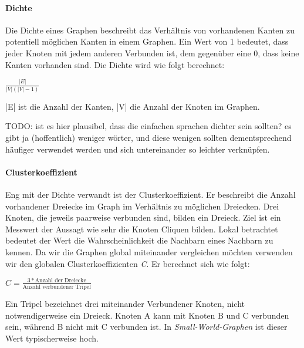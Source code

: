 \documentclass[12pt, a4paper]{article}
\begin{document}
\paragraph{Dichte}
Die Dichte eines Graphen beschreibt das Verhältnis von vorhandenen Kanten zu
potentiell möglichen Kanten in einem Graphen. Ein Wert von 1 bedeutet, dass
jeder Knoten mit jedem anderen Verbunden ist, dem gegenüber eine 0, dass keine
Kanten vorhanden sind. Die Dichte wird wie folgt berechnet:

\begin{center}
  \begin{math}
    \frac{|E|}{|V|(|V|-1)}
  \end{math}
\end{center}


|E| ist die Anzahl der Kanten, |V| die Anzahl der Knoten im Graphen. 

TODO: ist es hier plausibel, dass die einfachen sprachen dichter sein sollten?
es gibt ja (hoffentlich) weniger wörter, und diese wenigen sollten
dementsprechend häufiger verwendet werden und sich untereinander so leichter
verknüpfen.

\paragraph{Clusterkoeffizient}
Eng mit der Dichte verwandt ist der Clusterkoeffizient. Er beschreibt die
Anzahl vorhandener Dreiecke im Graph im Verhältnis zu möglichen Dreiecken. Drei
Knoten, die jeweils paarweise verbunden sind, bilden ein Dreieck. Ziel ist ein
Messwert der Aussagt wie sehr die Knoten Cliquen bilden. Lokal betrachtet
bedeutet der Wert die Wahrscheinlichkeit die Nachbarn eines Nachbarn zu kennen.
Da wir die Graphen global miteinander vergleichen möchten verwenden wir den
globalen Clusterkoeffizienten \emph{C}. Er berechnet sich wie folgt:

\begin{center}
  \begin{math}
    C = \frac{3*\text{Anzahl der Dreiecke}}{\text{Anzahl verbundener Tripel}}
  \end{math}
\end{center}


Ein Tripel bezeichnet drei miteinander Verbundener Knoten, nicht
notwendigerweise ein Dreieck. Knoten A kann mit Knoten B und C verbunden sein,
während B nicht mit C verbunden ist. In \emph{Small-World-Graphen} ist dieser
Wert typischerweise hoch. 


\end{document}
